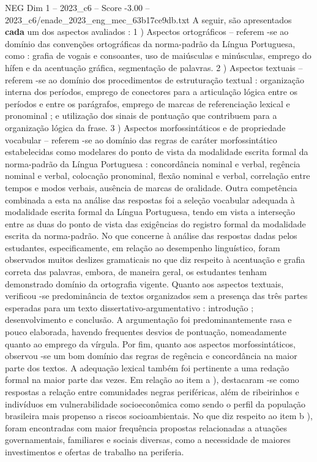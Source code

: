 \begin{textsample}{NEG Dim 1 – 2023\_c6 – Score -3.00 – 2023\_c6/enade\_2023\_eng\_mec\_63b17ce9db.txt}
A seguir, são apresentados \textbf{cada} um dos aspectos avaliados : 1 ) Aspectos ortográficos – referem -se ao domínio das convenções ortográficas da norma-padrão da Língua Portuguesa, como : grafia de vogais e consoantes, uso de maiúsculas e minúsculas, emprego do hífen e da acentuação gráfica, segmentação de palavras. 2 ) Aspectos textuais – referem -se ao domínio dos procedimentos de estruturação textual : organização interna dos períodos, emprego de conectores para a articulação lógica entre os períodos e entre os parágrafos, emprego de marcas de referenciação lexical e pronominal ; e utilização dos sinais de pontuação que contribuem para a organização lógica da frase. 3 ) Aspectos morfossintáticos e de propriedade vocabular – referem -se ao domínio das regras de caráter morfossintático estabelecidas como modelares do ponto de vista da modalidade escrita formal da norma-padrão da Língua Portuguesa : concordância nominal e verbal, regência nominal e verbal, colocação pronominal, flexão nominal e verbal, correlação entre tempos e modos verbais, ausência de marcas de oralidade.
Outra competência combinada a esta na análise das respostas foi a seleção vocabular adequada à modalidade escrita formal da Língua Portuguesa, tendo em vista a interseção entre as duas do ponto de vista das exigências do registro formal da modalidade escrita da norma-padrão.
No que concerne à análise das respostas dadas pelos estudantes, especificamente, em relação ao desempenho linguístico, foram observados muitos deslizes gramaticais no que diz respeito à acentuação e grafia correta das palavras, embora, de maneira geral, os estudantes tenham demonstrado domínio da ortografia vigente.
Quanto aos aspectos textuais, verificou -se predominância de textos organizados sem a presença das três partes esperadas para um texto dissertativo-argumentativo : introdução ; desenvolvimento e conclusão.
A argumentação foi predominantemente rasa e pouco elaborada, havendo frequentes desvios de pontuação, nomeadamente quanto ao emprego da vírgula.
Por fim, quanto aos aspectos morfossintáticos, observou -se um bom domínio das regras de regência e concordância na maior parte dos textos.
A adequação lexical também foi pertinente a uma redação formal na maior parte das vezes.
Em relação ao item a ), destacaram -se como respostas a relação entre comunidades negras periféricas, além de ribeirinhos e indivíduos em vulnerabilidade socioeconômica como sendo o perfil da população brasileira mais propenso a riscos socioambientais.
No que diz respeito ao item b ), foram encontradas com maior frequência propostas relacionadas a atuações governamentais, familiares e sociais diversas, como a necessidade de maiores investimentos e ofertas de trabalho na periferia.

\end{textsample}
